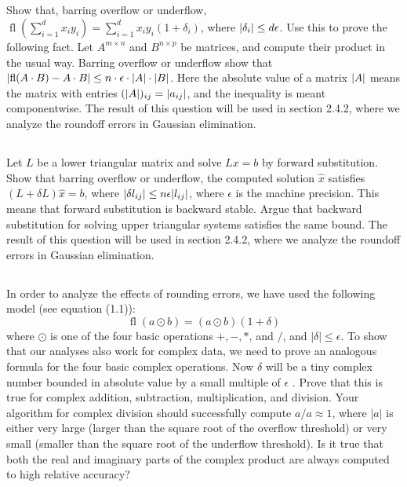 \documentclass[a4paper]{ctexart}
\DeclareMathOperator{\fl}{\text{fl}}
\newcommand{\pf}{\textbf{\color{pink}{proof:}}}
\begin{document}
\pf

\subsection{}
Show that, barring overﬂow or underﬂow, $\fl(\sum^d
_{i=1} x_i y_i) = \sum^d_{i=1} x_i y_i(1 + \delta_i)$, where $\abs{\delta_i} \le d\epsilon$. 
Use this to prove the
following fact. Let $A^{m\times n}$ and $B^{n\times p}$ be matrices, and compute their product
in the usual way. Barring overﬂow or underﬂow show that $\abs{\fl(A\cdot B) - A\cdot B} \le
n \cdot \epsilon \cdot \abs{A} \cdot \abs{B}$. Here the absolute value of a matrix $\abs{A}$ means the matrix with
entries $(\abs{A})_{ij} = \abs{a_{ij}}$, and the inequality is meant componentwise.
The result of this question will be used in section 2.4.2, where we analyze
the roundoﬀ errors in Gaussian elimination.

\pf

\subsection{}
Let $L$ be a lower triangular matrix and solve $Lx =
b$ by forward substitution. Show that barring overﬂow or underﬂow, the computed
solution $\hat{x}$ satisﬁes $(L + \delta L)\hat{x} = b$, where $\abs{\delta l_{ij}} \le n\epsilon\abs{l_{ij}}$, where $\epsilon$ is the
machine precision. This means that forward substitution is backward stable.
Argue that backward substitution for solving upper triangular systems satisﬁes
the same bound.
The result of this question will be used in section 2.4.2, where we analyze
the roundoﬀ errors in Gaussian elimination.

\pf

\subsection{}
In order to analyze the effects of rounding errors, 
we have used the following model (see equation (1.1)):
\begin{equation*}
    \fl(a\odot b) = (a \odot b)(1+\delta)
\end{equation*}
where $\odot$ is one of the four basic operations $+, -, *$, and $/$, and $|\delta| \le \epsilon$. 
To show
that our analyses also work for complex data, we need to prove an analogous
formula for the four basic complex operations. Now $\delta$ will be a tiny complex
number bounded in absolute value by a small multiple of $\epsilon$ . Prove that this
is true for complex addition, subtraction, multiplication, and division. Your
algorithm for complex division should successfully compute $a/a \approx 1$, where
$|a|$ is either very large (larger than the square root of the overflow threshold)
or very small (smaller than the square root of the underflow threshold). Is it
true that both the real and imaginary parts of the complex product are always
computed to high relative accuracy?
\end{document}
